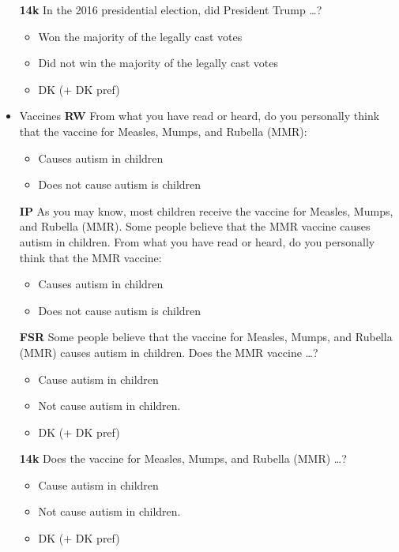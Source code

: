 \begin{itemize}
	\textbf{14k}\newline
	In the 2016 presidential election, did President Trump \ldots?
	\begin{itemize}
		\item Won the majority of the legally cast votes
		\item Did not win the majority of the legally cast votes
		\item DK (+ DK pref)
	\end{itemize}
	
	\item Vaccines\newline
	\textbf{RW}\newline
	From what you have read or heard, do you personally think that the vaccine for
	Measles, Mumps, and Rubella (MMR):
	\begin{itemize}
		\item Causes autism in children
		\item Does not cause autism is children
	\end{itemize}
	
	\textbf{IP}\newline
	As you may know, most children receive the vaccine for Measles, Mumps, and
	Rubella (MMR). Some people believe that the MMR vaccine causes autism in
	children. From what you have read or heard, do you personally think that the MMR
	vaccine:
	\begin{itemize}
		\item Causes autism in children
		\item Does not cause autism is children
	\end{itemize}
	
	\textbf{FSR}\newline
	Some people believe that the vaccine for Measles, Mumps, and Rubella (MMR)
	causes autism in children. Does the MMR vaccine \ldots?
	\begin{itemize}
		\item Cause autism in children
		\item Not cause autism in children.
		\item DK (+ DK pref)
	\end{itemize}
	
	\textbf{14k}\newline
	Does the vaccine for Measles, Mumps, and Rubella (MMR) \ldots?
	\begin{itemize}
		\item Cause autism in children
		\item Not cause autism in children.
		\item DK (+ DK pref)
	\end{itemize}
	

\end{itemize}
